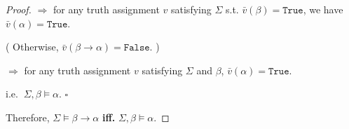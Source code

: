 \documentclass{article}
\newcommand{\whiteqed}{\hfill $\square$\par}
\begin{document}
\begin{proof}
    \hspace{6.3em}
    $\Longrightarrow$ for any truth assignment $v$ satisfying $\Sigma$ s.t. $\bar{v}(\beta)=\mathtt{True}$, we have $\bar{v}(\alpha)=\mathtt{True}$.

    \hspace{8.2em}
    ( Otherwise, $\bar{v}(\beta\to\alpha)=\mathtt{False}$. )

    \hspace{6.3em}
    $\Longrightarrow$ for any truth assignment $v$ satisfying $\Sigma$ and $\beta$, $\bar{v}(\alpha)=\mathtt{True}$.

    \hspace{6.3em}
    i.e. $\ \Sigma,\beta\vDash\alpha$. \whiteqed

    \vspace{2em} \hspace{1.3em}
    Therefore, $\Sigma\vDash\beta\to\alpha$ \textbf{iff.} $\Sigma,\beta\vDash\alpha$.
\end{proof}
\end{document}
